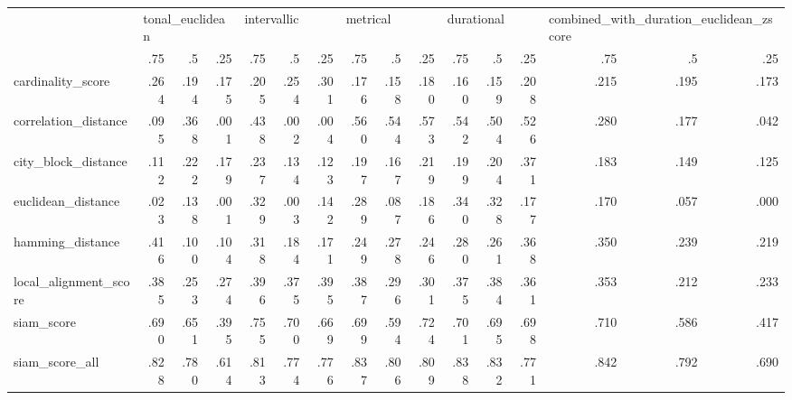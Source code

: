 \begin{tabular}{lrrrrrrrrrrrrrrr}
\toprule
{} & \multicolumn{3}{l}{tonal\_euclidean} & \multicolumn{3}{l}{intervallic} & \multicolumn{3}{l}{metrical} & \multicolumn{3}{l}{durational} & \multicolumn{3}{l}{combined\_with\_duration\_euclidean\_zscore} \\
{} & .75 & .5 & .25 & .75 & .5 & .25 & .75 & .5 & .25 & .75 & .5 & .25 & .75 & .5 & .25 \\
\midrule
cardinality\_score     & .264 & .194 & .175 & .205 & .254 & .301 & .176 & .158 & .180 & .160 & .159 & .208 & .215 & .195 & .173 \\
correlation\_distance  & .095 & .368 & .001 & .438 & .002 & .004 & .560 & .544 & .573 & .542 & .504 & .526 & .280 & .177 & .042 \\
city\_block\_distance   & .112 & .222 & .179 & .237 & .134 & .123 & .197 & .167 & .219 & .199 & .204 & .371 & .183 & .149 & .125 \\
euclidean\_distance    & .023 & .138 & .001 & .329 & .003 & .142 & .289 & .087 & .186 & .340 & .328 & .177 & .170 & .057 & .000 \\
hamming\_distance      & .416 & .100 & .104 & .318 & .184 & .171 & .249 & .278 & .246 & .280 & .261 & .368 & .350 & .239 & .219 \\
local\_alignment\_score & .385 & .253 & .274 & .396 & .375 & .395 & .387 & .296 & .301 & .375 & .384 & .361 & .353 & .212 & .233 \\
siam\_score            & .690 & .651 & .395 & .755 & .700 & .669 & .699 & .594 & .724 & .701 & .695 & .698 & .710 & .586 & .417 \\
siam\_score\_all        & .828 & .780 & .614 & .813 & .774 & .776 & .837 & .806 & .809 & .838 & .832 & .771 & .842 & .792 & .690 \\
\bottomrule
\end{tabular}

